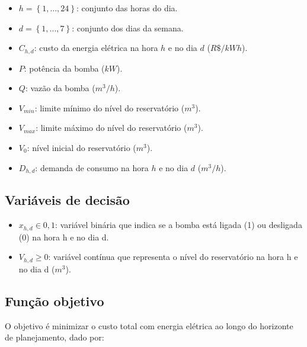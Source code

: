\begin{itemize}

\item[-] $h = \left\{1, ..., 24\right\}$: conjunto das horas do dia.

\item[-] $d = \left\{1, ..., 7\right\}$: conjunto dos dias da semana.

\item[-] $C_{h,d}$: custo da energia elétrica na hora $h$ e no dia $d$ ($R\$/kWh$).

\item[-] $P$: potência da bomba ($kW$).

\item[-] $Q$: vazão da bomba ($m^3/h$).

\item[-] $V_{min}$: limite mínimo do nível do reservatório ($m^3$).

\item[-] $V_{max}$: limite máximo do nível do reservatório ($m^3$).

\item[-] $V_{0}$: nível inicial do reservatório ($m^3$).

\item[-] $D_{h,d}$: demanda de consumo na hora $h$ e no dia $d$ ($m^3/h$).

\end{itemize}


\subsection{Variáveis de decisão}

\begin{itemize}

\item[-] $x_{h,d} \in {0, 1}$: variável binária que indica se a bomba está ligada (1) ou desligada (0) na hora h e no dia d.

\item[-] $V_{h,d} \geq 0$: variável contínua que representa o nível do reservatório na hora h e no dia d ($m^3$).
\end{itemize}

\subsection{Função objetivo}

O objetivo é minimizar o custo total com energia elétrica ao longo do horizonte de planejamento, dado por:

